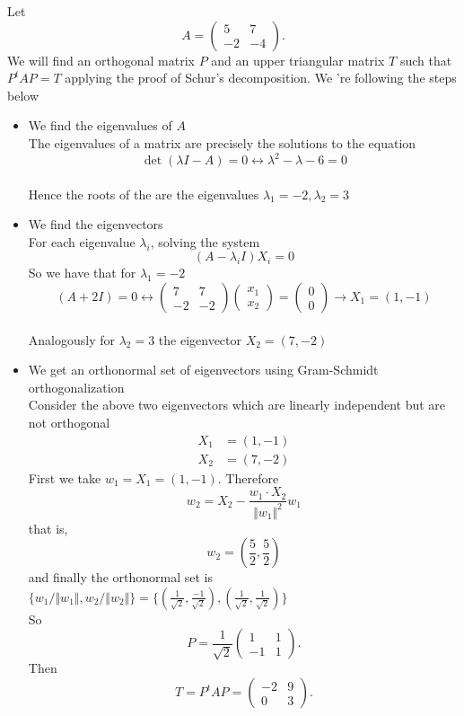 \documentclass[12pt]{article}
\begin{document}
Let 
$$
A = \begin{pmatrix} 5 & 7 \\ -2 & -4 \end{pmatrix}.
$$ 
We will find an orthogonal matrix $P$  and an upper triangular matrix $T$ such that $P^tAP=T$ applying the proof of Schur's decomposition.
 We 're following the steps below
\begin{itemize}
\item We find the eigenvalues of $A$ 
\\The eigenvalues of a matrix are precisely the solutions to the equation
$$
\det(\lambda I - A) = 0 \leftrightarrow \lambda^2-\lambda -6=0 
$$
\\Hence the roots of the  are the eigenvalues 
$\lambda_1=-2,\lambda_2=3$
\item We find the eigenvectors
\\For each eigenvalue $\lambda_i$, solving the system
$$ (A-\lambda_i I)X_i=0$$
So we have that
for $\lambda_1=-2$
$$(A+2I)=0  
\leftrightarrow \begin{pmatrix} 7 & 7 \\ -2 & -2 \end{pmatrix}\begin{pmatrix} x_1 \\x_2\end{pmatrix}=\begin{pmatrix} 0\\ 0\end{pmatrix}\rightarrow 
X_1=(1,-1)$$ 
\\Analogously for $\lambda_2=3$ 
the eigenvector $X_2=(7,-2)$
\item We get an orthonormal set of eigenvectors using Gram-Schmidt orthogonalization 
\\Consider the above two eigenvectors which are linearly independent but are not orthogonal 
\begin{align*}
X_1&=(1,-1)\\
X_2&=(7,-2)
\end{align*}
First we take $w_1=X_1=(1,-1)$. Therefore 
\[w_2= X_2 - \frac{w_1\cdot X_2}{\Vert w_1\Vert^2}w_1\] 
that is,
\[
w_2=(\frac{5}{2},\frac{5}{2})
\]
and finally the orthonormal set is 
$\{w_1/\Vert w_1\Vert,w_2/\Vert w_2\Vert\}=\{(\frac{1}{\sqrt{2}},\frac{-1}{\sqrt{2}}),(\frac{1}{\sqrt{2}},\frac{1}{\sqrt{2}})\}$
\\So 
$$P =\frac{1}{\sqrt{2}}\begin{pmatrix} 1 & 1 \\ -1 & 1 \end{pmatrix}.$$
Then $$T=P^tAP=\begin{pmatrix} -2 & 9 \\ 0 & 3 \end{pmatrix}.$$
\end{itemize}
\end{document}
